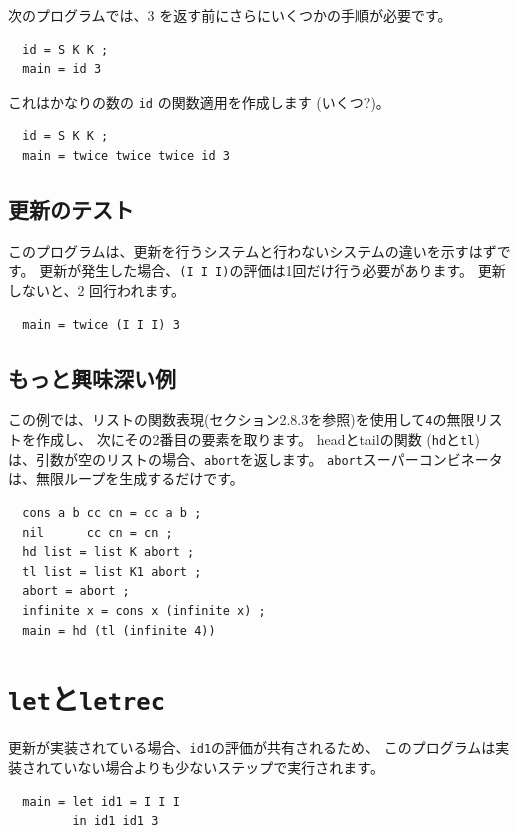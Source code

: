 \documentclass{jbook}
\begin{document}
次のプログラムでは、3 を返す前にさらにいくつかの手順が必要です。

\begin{verbatim}
  id = S K K ;
  main = id 3
\end{verbatim}

これはかなりの数の \texttt{id} の関数適用を作成します (いくつ?)。

\begin{verbatim}
  id = S K K ;
  main = twice twice twice id 3
\end{verbatim}

\subsection{更新のテスト}

このプログラムは、更新を行うシステムと行わないシステムの違いを示すはずです。
更新が発生した場合、\texttt{(I I I)}の評価は1回だけ行う必要があります。
更新しないと、2 回行われます。

\begin{verbatim}
  main = twice (I I I) 3
\end{verbatim}

\subsection{もっと興味深い例}

この例では、リストの関数表現(セクション2.8.3を参照)を使用して\texttt{4}の無限リストを作成し、
次にその2番目の要素を取ります。
headとtailの関数 (\texttt{hd}と\texttt{tl}) は、引数が空のリストの場合、\texttt{abort}を返します。
\texttt{abort}スーパーコンビネータは、無限ループを生成するだけです。

\begin{verbatim}
  cons a b cc cn = cc a b ;
  nil      cc cn = cn ;
  hd list = list K abort ;
  tl list = list K1 abort ;
  abort = abort ;
  infinite x = cons x (infinite x) ;
  main = hd (tl (infinite 4))
\end{verbatim}
\newpage

\section{\texttt{let}と\texttt{letrec}}

更新が実装されている場合、\texttt{id1}の評価が共有されるため、
このプログラムは実装されていない場合よりも少ないステップで実行されます。

\begin{verbatim}
  main = let id1 = I I I
         in id1 id1 3
\end{verbatim}
\end{document}
